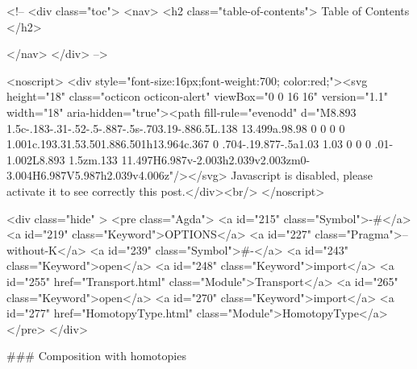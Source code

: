   <!-- 
  <div class="toc">
    <nav>
    <h2 class="table-of-contents"> Table of Contents </h2>
      

    </nav>
  </div>
   -->

  <noscript>
  <div style="font-size:16px;font-weight:700; color:red;"><svg height="18" class="octicon octicon-alert" viewBox="0 0 16 16" version="1.1" width="18" aria-hidden="true"><path fill-rule="evenodd" d="M8.893 1.5c-.183-.31-.52-.5-.887-.5s-.703.19-.886.5L.138 13.499a.98.98 0 0 0 0 1.001c.193.31.53.501.886.501h13.964c.367 0 .704-.19.877-.5a1.03 1.03 0 0 0 .01-1.002L8.893 1.5zm.133 11.497H6.987v-2.003h2.039v2.003zm0-3.004H6.987V5.987h2.039v4.006z"/></svg> Javascript is disabled, please activate it to see correctly this post.</div><br/>
  </noscript>

  <div class="hide" >
<pre class="Agda">
<a id="215" class="Symbol">{-#</a> <a id="219" class="Keyword">OPTIONS</a> <a id="227" class="Pragma">--without-K</a> <a id="239" class="Symbol">#-}</a>
<a id="243" class="Keyword">open</a> <a id="248" class="Keyword">import</a> <a id="255" href="Transport.html" class="Module">Transport</a>
<a id="265" class="Keyword">open</a> <a id="270" class="Keyword">import</a> <a id="277" href="HomotopyType.html" class="Module">HomotopyType</a>
</pre>
</div>


### Composition with homotopies

